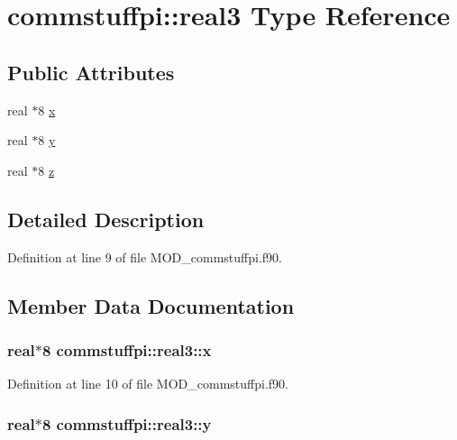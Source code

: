 \hypertarget{structcommstuffpi_1_1real3}{\section{commstuffpi\-:\-:real3 Type Reference}
\label{structcommstuffpi_1_1real3}
}
\subsection*{Public Attributes}
\begin{DoxyCompactItemize}
\item 
real $\ast$8 \hyperlink{structcommstuffpi_1_1real3_acae1bed8aedae5a57b1790e55e51c1c6}{x}
\item 
real $\ast$8 \hyperlink{structcommstuffpi_1_1real3_a00e2cd7ab840912863079050bc1aa573}{y}
\item 
real $\ast$8 \hyperlink{structcommstuffpi_1_1real3_a526f3664ab39affe6a04a39c2008aad7}{z}
\end{DoxyCompactItemize}


\subsection{Detailed Description}


Definition at line 9 of file M\-O\-D\-\_\-commstuffpi.\-f90.



\subsection{Member Data Documentation}
\hypertarget{structcommstuffpi_1_1real3_acae1bed8aedae5a57b1790e55e51c1c6}{
\subsubsection[{x}]{\setlength{\rightskip}{0pt plus 5cm}real$\ast$8 commstuffpi\-::real3\-::x}}\label{structcommstuffpi_1_1real3_acae1bed8aedae5a57b1790e55e51c1c6}


Definition at line 10 of file M\-O\-D\-\_\-commstuffpi.\-f90.

\hypertarget{structcommstuffpi_1_1real3_a00e2cd7ab840912863079050bc1aa573}{
\subsubsection[{y}]{\setlength{\rightskip}{0pt plus 5cm}real$\ast$8 commstuffpi\-::real3\-::y}}\label{structcommstuffpi_1_1real3_a00e2cd7ab840912863079050bc1aa573}


